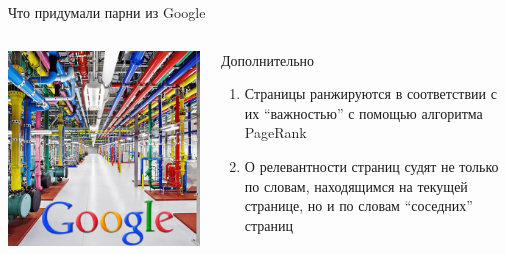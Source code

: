 \documentclass[10pt,a4paper]{beamer}
\begin{document}

\begin{frame}{Что придумали парни из Google}

\begin{columns}[C]
	\begin{column}{.50\textwidth}
    \vspace{1em}\includegraphics[scale=0.30]{images/google.jpg}
	\end{column}
    \begin{column}{.5\textwidth}
    \hspace{1em}Дополнительно
    \begin{enumerate}    
	\item Страницы ранжируются в соответствии с их ``важностью'' с помощью алгоритма PageRank
	\item О релевантности страниц судят не только по словам, находящимся на текущей странице, но и по словам ``соседних'' страниц
	\end{enumerate}
    \end{column}
\end{columns}

\end{frame}

\end{document}
